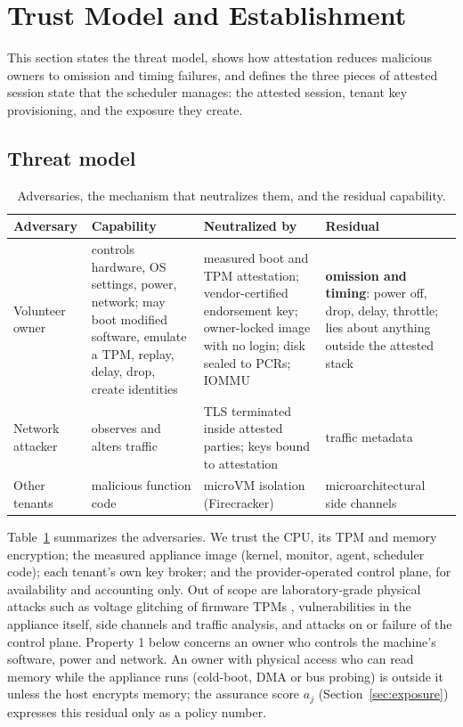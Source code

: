 \section{Trust Model and Establishment}
\label{sec:trust}

This section states the threat model, shows how attestation reduces malicious owners to omission and timing failures,
and defines the three pieces of attested session state that the scheduler manages: the attested session, tenant key provisioning,
and the exposure they create.

\subsection{Threat model}
\label{sec:threat}
\begin{table}[t]
\caption{Adversaries, the mechanism that neutralizes them, and the residual capability.}
\label{tab:threat}
\centering\scriptsize
\setlength{\tabcolsep}{2.5pt}
\begin{tabular}{@{}p{1.35cm}p{1.9cm}p{2.5cm}p{2.1cm}@{}}
\toprule
Adversary & Capability & Neutralized by & Residual \\
\midrule
Volunteer owner & controls hardware, OS settings, power, network; may boot modified software, emulate a TPM, replay, delay, drop, create identities &
measured boot and TPM attestation; vendor-certified endorsement key; owner-locked image with no login; disk sealed to PCRs; IOMMU & \textbf{omission and timing}: power off, drop, delay, throttle; lies about anything outside the attested stack \\
Network attacker & observes and alters traffic & TLS terminated inside attested parties; keys bound to attestation & traffic metadata \\
Other tenants & malicious function code & microVM isolation (Firecracker) & microarchitectural side channels \\
\bottomrule
\end{tabular}
\end{table}

Table~\ref{tab:threat} summarizes the adversaries. We trust the CPU, its TPM and memory encryption; the measured appliance image
(kernel, monitor, agent, scheduler code); each tenant's own key broker; and the provider-operated control plane, for
availability and accounting only. Out of scope are laboratory-grade physical attacks such as voltage glitching of
firmware TPMs \cite{jacob2023faultpm}, vulnerabilities in the appliance itself, side channels and traffic analysis, and attacks on or
failure of the control plane. Property 1 below concerns an owner who controls the machine's software, power and network. An owner with physical access who can read memory while the appliance runs (cold-boot, DMA or bus probing) is outside it unless the host encrypts memory; the assurance score $a_j$ (Section~\ref{sec:exposure}) expresses this residual only as a policy number.

